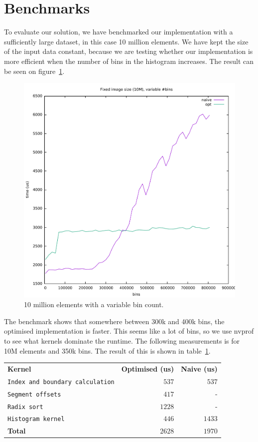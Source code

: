 \documentclass[12pt, a4paper, hidelinks]{article}
\def\fatline{\Xhline{2\arrayrulewidth}}
\renewcommand{\tt}[1]{\texttt{#1}}
\renewcommand{\bf}[1]{\textbf{#1}}
\begin{document}
\section{Benchmarks}
To evaluate our solution, we have benchmarked our implementation with
a sufficiently large dataset, in this case 10 million elements.
We have kept the size of the input data constant,
because we are testing whether our implementation is more
efficient when the number of bins in the histogram increases. The result
can be seen on figure~\ref{fig:graph1}.
\begin{figure}[htpb]
    \centering
    \includegraphics[width=0.6\linewidth]{img/graphs/10M-varbins.pdf}
    \caption{10 million elements with a variable bin count.}
    \label{fig:graph1}
\end{figure}
The benchmark shows that somewhere between 300k and 400k bins,
the optimised implementation is faster.
This seems like a lot of bins,
so we use nvprof to see what kernels dominate the runtime.
The following measurements is for 10M elements and 350k bins.
The result of this is shown in table~\ref{table:nvprof0}.

\begin{table}
    \begin{center}
        \begin{tabular}{l|r|r}
            \bf{Kernel} & \bf{Optimised (us)} & \bf{Naive (us)}   \\ \fatline
            \tt{Index and boundary calculation} & $537$  & $537$  \\ \hline
            \tt{Segment offsets}                & $417$  & -      \\ \hline
            \tt{Radix sort}                     & $1228$ & -      \\ \hline
            \tt{Histogram kernel}               & $446$  & $1433$ \\ \fatline
            \bf{Total}                          & $2628$ & $1970$ \\
        \end{tabular}\\
        \label{table:nvprof0}
    \end{center}
\end{table}
\end{document}
